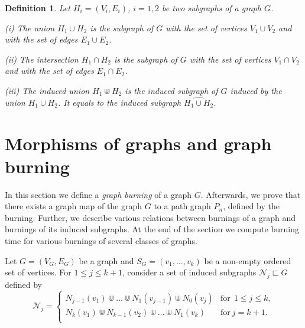 \documentclass[a4paper, 11pt]{article}
\newtheorem{definition}[theorem]{Definition}
\begin{document}
\begin{definition}\label{d2.8} \rm Let $H_i=(V_i, E_i)$,  $i=1,2$ be two subgraphs of a graph $G$.

(i)  The \emph{union} $H_1\cup H_2$ is the subgraph of $G$ with  the set of vertices $V_1\cup V_2$ and with the set of edges $E_1\cup E_2$. 

(ii) The \emph{intersection} $H_1\cap H_2$ is the subgraph of $G$ with  the set of vertices $V_1\cap V_2$ and with the set of edges $E_1\cap E_2$. 

(iii) The \emph{induced union} $H_1\Cup H_2$ is the induced subgraph of $G$ induced by the union $H_1\cup H_2$. It  equals  to the induced subgraph $\widehat{H_1\cup H_2}$. 

\end{definition} 

\section{Morphisms of  graphs and graph burning}\label{S3}
\setcounter{equation}{0}

In this section we define  a \emph{graph burning} of a graph $G$. Afterwards, we prove that there exists a graph map of the graph $G$ to a path graph $P_n$, defined by the burning. Further, we describe  various relations between burnings of a graph and burnings of its induced subgraphs. At the end of the section  we compute burning time for various burnings of several classes of graphs. 

 Let $G=(V_G,E_G)$ be a graph and 
$S_G=(v_1, \dots, v_k)$ be a non-empty ordered  set of vertices. For $1\leq j\leq k+1$,
consider a set of induced  subgraphs $\mathcal N_j\sqsubset G$ defined by 
\begin{equation}\label{3.1}
\mathcal N_j= \begin{cases} N_{j-1} (v_1)\Cup \dots \Cup N_1(v_{j-1})\Cup N_0(v_j) &  \text{for} \ \  1\leq j\leq k,\\
 N_{k} (v_1)\Cup N_{k-1}(v_2)\Cup \dots \Cup N_1(v_{k}) & \text{for} \  j=k+1.\\
\end{cases} 
\end{equation}
\end{document}

